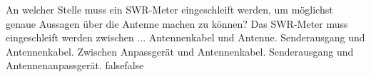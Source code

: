     {An welcher Stelle muss ein SWR-Meter eingeschleift werden, um möglichst genaue Aussagen über die Antenne machen zu können? Das SWR-Meter muss eingeschleift werden zwischen ...}
    {Antennenkabel und Antenne.}
    {Senderausgang und Antennenkabel.}
    {Zwischen Anpassgerät und Antennenkabel.}
    {Senderausgang und Antennenanpassgerät.}
    {false}{false}